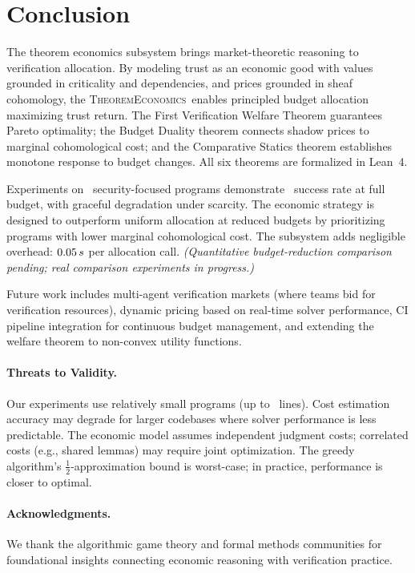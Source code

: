 \documentclass[11pt]{article}
\newcommand{\TheoremEcon}{\textsc{TheoremEconomics}}
\begin{document}
\section{Conclusion}\label{sec:conclusion}

The theorem economics subsystem brings market-theoretic reasoning to
verification allocation.  By modeling trust as an economic good with
values grounded in criticality and dependencies, and prices grounded
in sheaf cohomology, the \TheoremEcon\ enables principled budget
allocation maximizing trust return.  The First Verification Welfare
Theorem guarantees Pareto optimality; the Budget Duality theorem
connects shadow prices to marginal cohomological cost; and the
Comparative Statics theorem establishes monotone response to budget
changes.  All six theorems are formalized in Lean~4.

Experiments on \ppLVtotalPrograms\ security-focused programs
demonstrate \ppLVsuccessRate\ success rate at full budget,
with graceful degradation under scarcity.  The economic strategy is
designed to outperform uniform allocation at reduced budgets by
prioritizing programs with lower marginal cohomological cost.
The subsystem adds negligible overhead:
$0.05\,s$ per allocation call.
\emph{(Quantitative budget-reduction comparison pending; real comparison experiments in progress.)}

Future work includes multi-agent verification markets (where teams
bid for verification resources), dynamic pricing based on real-time
solver performance, CI pipeline integration for continuous budget
management, and extending the welfare theorem to non-convex utility
functions.

\paragraph{Threats to Validity.}
Our experiments use relatively small programs (up to \compLargeMeanLines\
lines).  Cost estimation accuracy may degrade for larger codebases
where solver performance is less predictable.  The economic model
assumes independent judgment costs; correlated costs (e.g., shared
lemmas) may require joint optimization.  The greedy algorithm's
$\frac{1}{2}$-approximation bound is worst-case; in practice,
performance is closer to optimal.

\paragraph{Acknowledgments.}
We thank the algorithmic game theory and formal methods communities
for foundational insights connecting economic reasoning with
verification practice.
\end{document}
